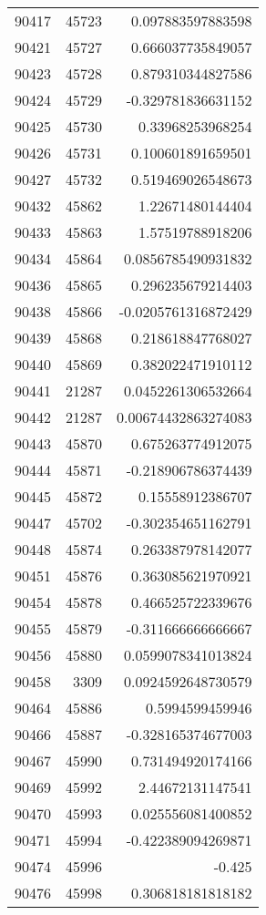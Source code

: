 \begin{tabular}{r | r | r}
90417 & 45723 & 0.097883597883598 \\
90421 & 45727 & 0.666037735849057 \\
90423 & 45728 & 0.879310344827586 \\
90424 & 45729 & -0.329781836631152 \\
90425 & 45730 & 0.33968253968254 \\
90426 & 45731 & 0.100601891659501 \\
90427 & 45732 & 0.519469026548673 \\
90432 & 45862 & 1.22671480144404 \\
90433 & 45863 & 1.57519788918206 \\
90434 & 45864 & 0.0856785490931832 \\
90436 & 45865 & 0.296235679214403 \\
90438 & 45866 & -0.0205761316872429 \\
90439 & 45868 & 0.218618847768027 \\
90440 & 45869 & 0.382022471910112 \\
90441 & 21287 & 0.0452261306532664 \\
90442 & 21287 & 0.00674432863274083 \\
90443 & 45870 & 0.675263774912075 \\
90444 & 45871 & -0.218906786374439 \\
90445 & 45872 & 0.15558912386707 \\
90447 & 45702 & -0.302354651162791 \\
90448 & 45874 & 0.263387978142077 \\
90451 & 45876 & 0.363085621970921 \\
90454 & 45878 & 0.466525722339676 \\
90455 & 45879 & -0.311666666666667 \\
90456 & 45880 & 0.0599078341013824 \\
90458 & 3309 & 0.0924592648730579 \\
90464 & 45886 & 0.5994599459946 \\
90466 & 45887 & -0.328165374677003 \\
90467 & 45990 & 0.731494920174166 \\
90469 & 45992 & 2.44672131147541 \\
90470 & 45993 & 0.025556081400852 \\
90471 & 45994 & -0.422389094269871 \\
90474 & 45996 & -0.425 \\
90476 & 45998 & 0.306818181818182 \\

\end{tabular}
